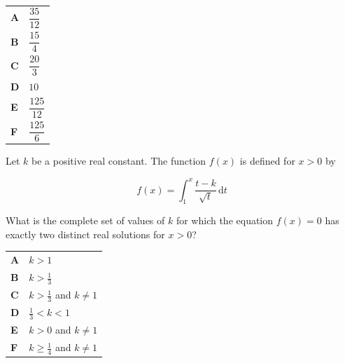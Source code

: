 \documentclass[11pt,a4paper]{article}
\begin{document}
\begin{enumerate}[label=\textbf{\arabic*.},leftmargin=*,itemsep=0pt,start=5]
\par\vspace*{12pt}
\begin{tabularx}{\linewidth}{@{}>{\bfseries}l Y@{}}
A &
$\dfrac{35}{12}$
\\[0.8em]
B &
$\dfrac{15}{4}$
\\[0.8em]
C &
$\dfrac{20}{3}$
\\[0.8em]
D &
$10$
\\[0.8em]
E &
$\dfrac{125}{12}$
\\[0.8em]
F &
$\dfrac{125}{6}$
\\
\end{tabularx}
\end{enumerate}
\clearpage
\thispagestyle{djspaper}
\vspace*{8pt}
\begin{enumerate}[label=\textbf{\arabic*.},leftmargin=*,itemsep=0pt,start=6]
\questionitem[Integration]
Let $k$ be a positive real constant. The function $f(x)$ is defined for $x > 0$ by

\[ f(x) = \int_1^x \frac{t - k}{\sqrt{t}} \, \mathrm{d}t \]

What is the complete set of values of $k$ for which the equation $f(x) = 0$ has exactly two distinct real solutions for $x > 0$?

\par\vspace*{12pt}
\begin{tabularx}{\linewidth}{@{}>{\bfseries}l Y@{}}
A &
$k > 1$
\\[0.8em]
B &
$k > \frac{1}{3}$
\\[0.8em]
C &
$k > \frac{1}{3}$ and $k \neq 1$
\\[0.8em]
D &
$\frac{1}{3} < k < 1$
\\[0.8em]
E &
$k > 0$ and $k \neq 1$
\\[0.8em]
F &
$k \ge \frac{1}{4}$ and $k \neq 1$
\\
\end{tabularx}
\end{enumerate}
\end{document}
